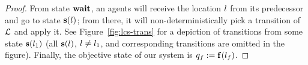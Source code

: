 \begin{proof}
	From state $\mathbf{wait}$, an agents will receive the location $l$ from its predecessor and go to state $\mathbf{s}(l)$; from there, it will non-deterministically pick a transition of $\mathcal{L}$ and apply it. See Figure~\ref{fig:lcs-trans} for a depiction of transitions from some state $\mathbf{s}(l_1)$ (all $\mathbf{s}(l)$, $l \ne l_1$, and corresponding transitions are omitted in the figure). 
	Finally, the objective state of our system is $q_f := \mathbf{f}(l_f)$.



\end{proof}
